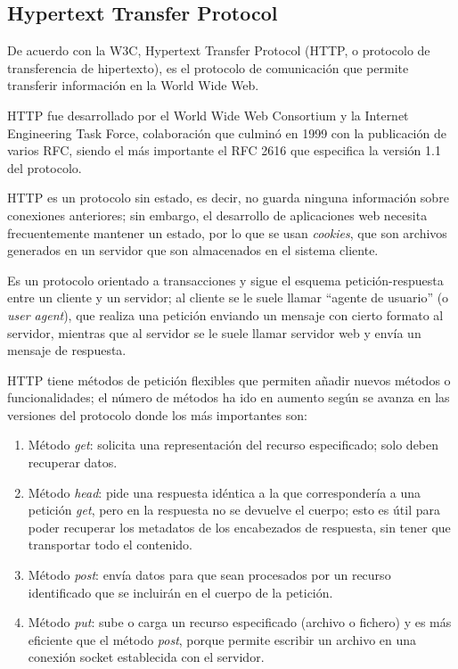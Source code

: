 \subsection{Hypertext Transfer Protocol}
De acuerdo con la W3C\cite{noauthor_http_nodate}, Hypertext Transfer Protocol (HTTP, o protocolo de transferencia de hipertexto), es el protocolo de comunicación que permite transferir información en la World Wide Web.


HTTP fue desarrollado por el World Wide Web Consortium y la Internet Engineering Task Force, colaboración que culminó en 1999 con la publicación de varios RFC, siendo el más importante el RFC 2616 que especifica la versión 1.1 del protocolo.


HTTP es un protocolo sin estado, es decir, no guarda ninguna información sobre conexiones anteriores; sin embargo, el desarrollo de aplicaciones web necesita frecuentemente mantener un estado, por lo que se usan \textit{cookies}, que son archivos generados en un servidor que son almacenados en el sistema cliente.


Es un protocolo orientado a transacciones y sigue el esquema petición-respuesta entre un cliente y un servidor; al cliente se le suele llamar ``agente de usuario'' (o \textit{user agent}), que realiza una petición enviando un mensaje con cierto formato al servidor, mientras que al servidor se le suele llamar servidor web y envía un mensaje de respuesta. 


HTTP tiene métodos de petición flexibles que permiten añadir nuevos métodos o funcionalidades; el número de métodos ha ido en aumento según se avanza en las versiones del protocolo donde los más importantes son:


\begin{enumerate}
    \item Método \textit{get}: solicita una representación del recurso especificado; solo deben recuperar datos. 
    \item Método \textit{head}: pide una respuesta idéntica a la que correspondería a una petición \textit{get}, pero en la respuesta no se devuelve el cuerpo; esto es útil para poder recuperar los metadatos de los encabezados de respuesta, sin tener que transportar todo el contenido.
    \item Método \textit{post}: envía datos para que sean procesados por un recurso identificado que se incluirán en el cuerpo de la petición. 
    \item Método \textit{put}: sube o carga un recurso especificado (archivo o fichero) y es más eficiente que el método \textit{post}, porque permite escribir un archivo en una conexión socket establecida con el servidor.
\end{enumerate}